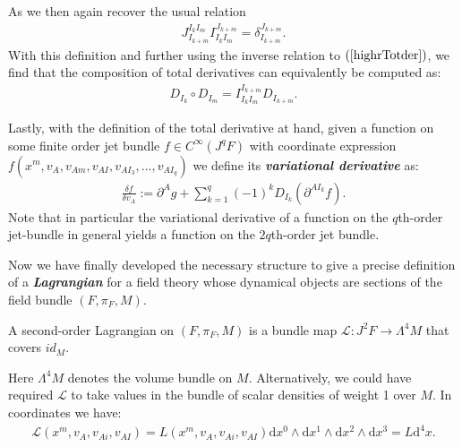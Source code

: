 As we then again recover the usual relation \begin{align}
J^{I_kI_m}_{I_{k+m}} I^{J_{k+m}}_{I_k I_m} = \delta^{J_{k+m}}_{I_{k+m}}.
\end{align}
With this definition and further using the inverse relation to $(\ref{highrTotder})$, we find that the composition of total derivatives can equivalently be computed as:
\begin{align}
   D_{I_k} \circ D_{I_m} =  I^{I_{k+m} }_{I_k I_m} D_{I_{k+m}}.
\end{align}
 

Lastly, with the definition of the total derivative at hand, given a function on some finite order jet bundle $f \in C^{\infty}(J^qF)$ with coordinate expression $f(x^m,v_A,v_{Am},v_{AI},v_{AI_{3}},...,v_{AI_{q}})$ we define its \textit{\textbf{variational derivative}} as: 
\begin{align}\label{varDer}
\frac{\delta f}{\delta v_A} := \partial^{A}g + \sum _{k = 1}^q (-1)^k D_{I_k}(\partial^{AI_k}f).
\end{align}
Note that in particular the variational derivative of a function on the $q$th-order jet-bundle in general yields a function on the $2q$th-order jet bundle.

Now we have finally developed the necessary structure to give a precise definition of a \textbf{\textit{Lagrangian}} for a field theory whose dynamical objects are sections of the field bundle $(F, \pi_F,M)$.
\begin{definition}[Lagrangian]
A second-order Lagrangian on $(F,\pi_F,M)$ is a bundle map $\mathcal{L} : J^2F \rightarrow \Lambda^4M$ that covers $id_M$.
\end{definition}
Here $\Lambda^4 M$ denotes the volume bundle on $M$. Alternatively, we could have required $\mathcal{L}$ to take values in the bundle of scalar densities of weight 1 over $M$. In coordinates we have: 
\begin{align}
    \mathcal{L}(x^m,v_A,v_{Ai},v_{AI}) = L(x^m,v_A,v_{Ai},v_{AI}) \mathrm{d}x^0 \wedge \mathrm{d}x^1 \wedge \mathrm{d}x^2 \wedge \mathrm{d}x^3 = L \mathrm{d}^4x.
\end{align} 

